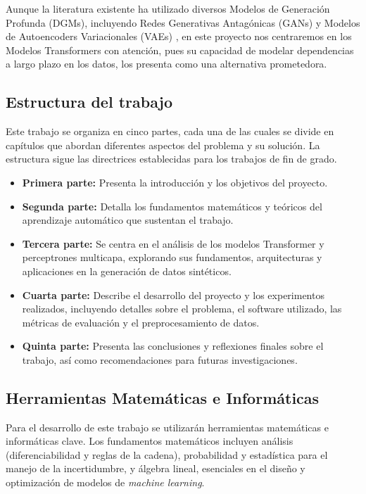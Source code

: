 Aunque la literatura existente ha utilizado diversos Modelos de Generación Profunda (DGMs), 
incluyendo Redes Generativas Antagónicas (GANs) y Modelos de Autoencoders
Variacionales (VAEs) \cite{de_deep_2022}, en este proyecto nos centraremos en los Modelos
Transformers con atención, pues su capacidad de modelar dependencias a largo
plazo en los datos, los presenta como una alternativa prometedora.

\subsection{Estructura del trabajo}

Este trabajo se organiza en cinco partes, cada una de las cuales se divide en
capítulos que abordan diferentes aspectos del problema y su solución. La
estructura sigue las directrices establecidas para los trabajos de fin de grado.

\begin{itemize}
    \item \textbf{Primera parte:} Presenta la introducción y los objetivos del
    proyecto. 
    \item \textbf{Segunda parte:} Detalla los fundamentos matemáticos
    y teóricos del aprendizaje automático que sustentan el trabajo.
    
    \item \textbf{Tercera parte:} Se centra en el análisis de los modelos
    Transformer y perceptrones multicapa, explorando sus fundamentos,
    arquitecturas y aplicaciones en la generación de datos sintéticos.
    
    \item \textbf{Cuarta parte:} Describe el desarrollo del proyecto y los
    experimentos realizados, incluyendo detalles sobre el problema, el software
    utilizado, las métricas de evaluación y el preprocesamiento de datos.
    
    \item \textbf{Quinta parte:} Presenta las conclusiones y reflexiones finales
    sobre el trabajo, así como recomendaciones para futuras investigaciones.
    \end{itemize}

\subsection{Herramientas Matemáticas e Informáticas}

Para el desarrollo de este trabajo se utilizarán herramientas matemáticas e
informáticas clave. Los fundamentos matemáticos incluyen análisis
(diferenciabilidad y reglas de la cadena), probabilidad y estadística para el
manejo de la incertidumbre, y álgebra lineal, esenciales en el diseño y
optimización de modelos de \textit{machine learning}. 


